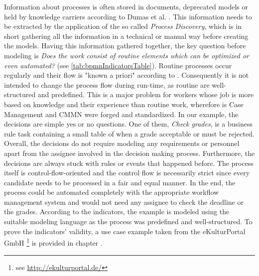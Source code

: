 Information about processes is often stored in documents, deprecated models or held by knowledge carriers according to Dumas et al. \cite{Dumas2013}. This information needs to be extracted by the application of the so called \textit{Process Discovery}, which is in short gathering all the information in a technical or manual way before creating the models. Having this information gathered together, the key question before modeling is \textit{Does the work consist of routine elements which can be optimized or even automated?} (see \ref{tab:bpmnIndicatorsTable}). Routine processes occur regularly and their flow is "known a priori" according to \cite{Zeising_2014}. Consequently it is not intended to change the process flow during run-time, as routine are well-structured and predefined. This is a major problem for workers whose job is more based on knowledge and their experience than routine work, wherefore is Case Management and CMMN were forged and standardized. 
In our example, the decisions are simple yes or no questions. One of them, \textit{Check grades}, is a business rule task containing a small table of when a grade acceptable or must be rejected. Overall, the decisions do not require modeling any requirements or personnel apart from the assignee involved in the decision making process. Furthermore, the decisions are always stuck with rules or events that happened before. The process itself is control-flow-oriented and the control flow is necessarily strict since every candidate needs to be processed in a fair and equal manner. In the end, the process could be automated completely with the appropriate workflow management system and would not need any assignee to check the deadline or the grades. 
According to the indicators, the example is modeled using the suitable modeling language as the process was predefined and well-structured. To prove the indicators' validity, a use case example taken from the eKulturPortal GmbH \footnote{see \url{http://ekulturportal.de/}} is provided in chapter . 

